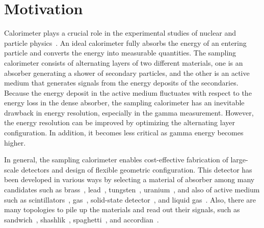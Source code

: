\documentclass[12pt,times,draftclsnofoot,a4paper]{elsarticle}
\begin{document}
\linenumbers

\section{Motivation}
\label{sec:mot}

Calorimeter plays a crucial role in the experimental studies of nuclear and particle physics~\cite{unitext}. An ideal calorimeter fully absorbs the energy of an entering particle and converts the energy into measurable quantities. The sampling calorimeter consists of alternating layers of two different materials, one is an absorber generating a shower of secondary particles, and the other is an active medium that generates signals from the energy deposits of the secondaries. Because the energy deposit in the active medium fluctuates with respect to the energy loss in the dense absorber, the sampling calorimeter has an inevitable drawback in energy resolution, especially in the gamma measurement. However, the energy resolution can be improved by optimizing the alternating layer configuration.  In addition, it becomes less critical as gamma energy becomes higher.

In general, the sampling calorimeter enables cost-effective fabrication of large-scale detectors and design of flexible geometric configuration. This detector has been developed in various ways by selecting a material of absorber among many candidates such as brass~\cite{CMS:mat}, lead~\cite{CDF:mat}, tungsten~\cite{DELPHI:mat}, uranium~\cite{UGAS:mat}, and also of active medium such as scintillators~\cite{CMS:mat,CDF:mat}, gas~\cite{UGAS:mat}, solid-state detector~\cite{DELPHI:mat}, and liquid gas~\cite{LiqAR:mat}. Also, there are many topologies to pile up the materials and read out their signals, such as sandwich~\cite{KOTO:MB}, shashlik~\cite{shashlik:con}, spaghetti~\cite{KLOE:con}, and accordian~\cite{LiqAR:mat}. 
\end{document}
